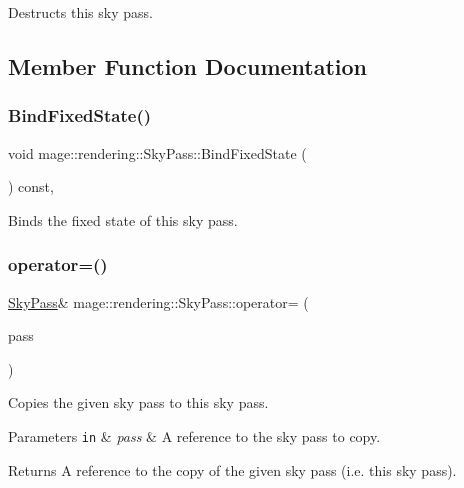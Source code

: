 Destructs this sky pass. 

\subsection{Member Function Documentation}
\hypertarget{classmage_1_1rendering_1_1_sky_pass_ab2e7bf506b3a038264579aa3c494f14d}{}\label{classmage_1_1rendering_1_1_sky_pass_ab2e7bf506b3a038264579aa3c494f14d} 
\subsubsection{\texorpdfstring{Bind\+Fixed\+State()}{BindFixedState()}}
{\footnotesize\ttfamily void mage\+::rendering\+::\+Sky\+Pass\+::\+Bind\+Fixed\+State (\begin{DoxyParamCaption}{ }\end{DoxyParamCaption}) const\hspace{0.3cm}{\ttfamily [private]}, {\ttfamily [noexcept]}}

Binds the fixed state of this sky pass. \hypertarget{classmage_1_1rendering_1_1_sky_pass_a8364836c5db0dc3e9894e1749ab302e8}{}\label{classmage_1_1rendering_1_1_sky_pass_a8364836c5db0dc3e9894e1749ab302e8} 
\subsubsection{\texorpdfstring{operator=()}{operator=()}\hspace{0.1cm}{\footnotesize\ttfamily [1/2]}}
{\footnotesize\ttfamily \hyperlink{classmage_1_1rendering_1_1_sky_pass}{Sky\+Pass}\& mage\+::rendering\+::\+Sky\+Pass\+::operator= (\begin{DoxyParamCaption}\item[{const \hyperlink{classmage_1_1rendering_1_1_sky_pass}{Sky\+Pass} \&}]{pass }\end{DoxyParamCaption})\hspace{0.3cm}{\ttfamily [delete]}}

Copies the given sky pass to this sky pass.


\begin{DoxyParams}[1]{Parameters}
\mbox{\tt in}  & {\em pass} & A reference to the sky pass to copy. \\
\hline
\end{DoxyParams}
\begin{DoxyReturn}{Returns}
A reference to the copy of the given sky pass (i.\+e. this sky pass). 
\end{DoxyReturn}
\hypertarget{classmage_1_1rendering_1_1_sky_pass_ad844a754a13fa90ef87aa62745ea936d}{}\label{classmage_1_1rendering_1_1_sky_pass_ad844a754a13fa90ef87aa62745ea936d} 
